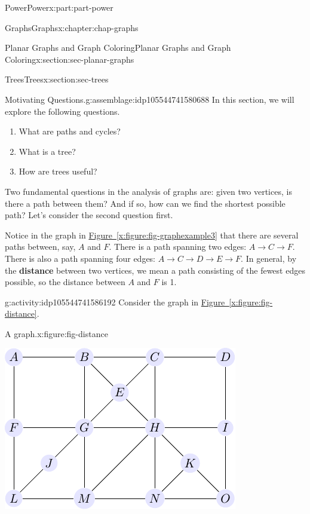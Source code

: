 \documentclass[oneside,10pt,]{book}
\newcommand{\xreffont}{\relax}
\newcommand{\terminology}[1]{\textbf{#1}}
\numberwithin{equation}{section}
\begin{document}
\begin{partptx}{Power}{}{Power}{}{}{x:part:part-power}
\begin{chapterptx}{Graphs}{}{Graphs}{}{}{x:chapter:chap-graphs}
\begin{sectionptx}{Planar Graphs and Graph Coloring}{}{Planar Graphs and Graph Coloring}{}{}{x:section:sec-planar-graphs}
\end{sectionptx}
%
%
\typeout{************************************************}
\typeout{************************************************}
%
\begin{sectionptx}{Trees}{}{Trees}{}{}{x:section:sec-trees}
\begin{assemblage}{Motivating Questions.}{g:assemblage:idp105544741580688}%
In this section, we will explore the following questions. %
\begin{enumerate}
\item{}What are paths and cycles?%
\item{}What is a tree?%
\item{}How are trees useful?%
\end{enumerate}
%
\end{assemblage}
Two fundamental questions in the analysis of graphs are: given two vertices, is there a path between them? And if so, how can we find the shortest possible path? Let's consider the second question first.%
\par
Notice in the graph in \hyperref[x:figure:fig-graphexample3]{Figure~{\xreffont\ref{x:figure:fig-graphexample3}}} that there are several paths between, say, \(A\) and \(F\). There is a path spanning two edges: \(A \to C \to F\). There is also a path spanning four edges: \(A\to C \to D \to E \to F\). In general, by the \terminology{distance} between two vertices, we mean a path consisting of the fewest edges possible, so the distance between \(A\) and \(F\) is 1.%
\begin{activity}{}{g:activity:idp105544741586192}%
Consider the graph in \hyperref[x:figure:fig-distance]{Figure~{\xreffont\ref{x:figure:fig-distance}}}.%
\begin{figureptx}{A graph.}{x:figure:fig-distance}{}%
\begin{image}{0.25}{0.5}{0.25}%
\includegraphics[width=\linewidth]{images/graph04.pdf}

\end{image}
\end{figureptx}
\end{activity}
\end{sectionptx}
\end{chapterptx}
\end{partptx}
\end{document}
